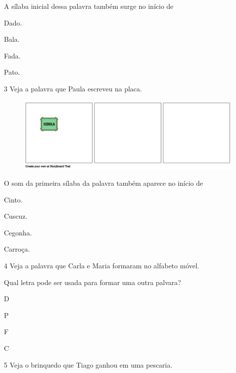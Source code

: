 A sílaba inicial dessa palavra também surge no início de

\begin{escolha}
\item Dado.

\item Bala.

\item Fada.

\item Pato.
\end{escolha}

\num{3} Veja a palavra que Paula escreveu na placa.

\begin{figure}[htpb!]
\centering
\includegraphics[width=.5\textwidth]{media/image176.png}
\end{figure}


O som da primeira sílaba da palavra também aparece no início de

\begin{escolha}
\item Cinto.

\item Cuscuz.

\item Cegonha.

\item Carroça.
\end{escolha}


\num{4} Veja a palavra que Carla e Maria formaram no alfabeto móvel.

Qual letra pode ser usada para formar uma outra palvara?

\begin{escolha}
\item D

\item P

\item F

\item C
\end{escolha}

\num{5} Veja o brinquedo que Tiago ganhou em uma pescaria.

